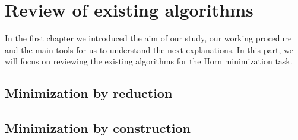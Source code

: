\chapter{Review of existing algorithms}

In the first chapter we introduced the aim of our study, our working procedure
and the main tools for us to understand the next explanations. In this part, we
will focus on reviewing the existing algorithms for the Horn minimization task. 



\section{Minimization by reduction}










\section{Minimization by construction}






